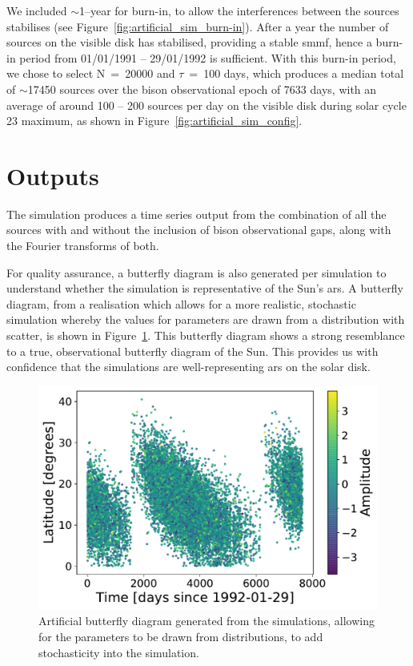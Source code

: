 We included $\sim$1--year for burn-in, to allow the interferences between the sources stabilises (see Figure~\ref{fig:artificial_sim_burn-in}). After a year the number of sources on the visible disk has stabilised, providing a stable \gls{smmf}, hence a burn-in period from 01/01/1991 -- 29/01/1992 is sufficient. With this burn-in period, we chose to select N~=~20000 and $\tau$~=~100 days, which produces a median total of $\sim$17450 sources over the \gls{bison} observational epoch of 7633 days, with an average of around 100 -- 200 sources per day on the visible disk during solar cycle 23 maximum, as shown in Figure~\ref{fig:artificial_sim_config}.




\section{Outputs}


The simulation produces a time series output from the combination of all the sources with and without the inclusion of \gls{bison} observational gaps, along with the Fourier transforms of both. 

For quality assurance, a butterfly diagram is also generated per simulation to understand whether the simulation is representative of the Sun's \glspl{ar}. A butterfly diagram, from a realisation which allows for a more realistic, stochastic simulation whereby the values for parameters are drawn from a distribution with scatter, is shown in Figure~\ref{fig:fake_butterfly}. This butterfly diagram shows a strong resemblance to a true, observational butterfly diagram of the Sun. This provides us with confidence that the simulations are well-representing \glspl{ar} on the solar disk.


\begin{figure}[ht!]
	\centering
	\includegraphics[width=0.85\columnwidth]{24h_fake_butterfly.pdf}
	\caption{Artificial butterfly diagram generated from the simulations, allowing for the parameters to be drawn from distributions, to add stochasticity into the simulation.}
	\label{fig:fake_butterfly}
\end{figure}


